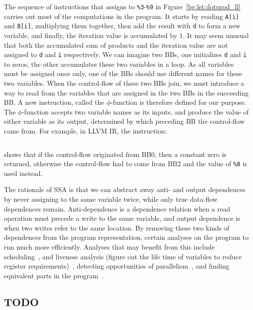 The sequence of instructions that assigns to \verb|%3|-\verb|%9| in
Figure~\ref{bg:lst:dotprod_ll} carries out most of the computations in the
program.  It starts by reading \verb|A[i]| and \verb|B[i]|, multiplying them
together, then add the result with \verb|d| to form a new variable, and
finally, the iteration value is accumulated by $1$.  It may seem unusual that
both the accumulated sum of products and the iteration value are not assigned
to \verb|d| and \verb|i| respectively.  We can imagine two BBs, one initializes
\verb|d| and \verb|i| to zeros, the other accumulates these two variables in
a loop.  As all variables must be assigned once only, one of the BBs should
use different names for these two variables.  When the control-flow of these
two BBs join, we must introduce a way to read from the variables that are
assigned in the two BBs in the succeeding BB\@.  A new instruction, called the
$\phi$-function is therefore defined for our purpose.  The $\phi$-function
accepts two variable names as its inputs, and produce the value of either
variable as its output, determined by which preceding BB the control-flow came
from.  For example, in LLVM IR, the instruction:
\begin{lstlisting}[language=LLVM, basicstyle=\tt]
    %d.01 = phi float [ 0.000000e+00, %0 ], [ %8, %2 ]
\end{lstlisting}\vspace{-16.5pt}
shows that if the control-flow originated from BB0, then a constant zero is
returned, otherwise the control-flow had to come from BB2 and the value of
\verb|%8| is used instead.

The rationale of SSA is that we can abstract away anti- and output dependences
by never assigning to the same variable twice, while only true data-flow
dependences remain.  Anti-dependence is a dependence relation when a read
operation must precede a write to the same variable, and output dependence is
when two writes refer to the same location.  By removing these two kinds of
dependences from the program representation, certain analyses on the program
to run much more efficiently.  Analyses that may benefit from this include
scheduling~\cite{rau94}, and liveness analysis (figure out the life time
of variables to reduce register requirements)~\cite{cytron91}, detecting
opportunities of parallelism~\cite{cytron87}, and finding equivalent parts in
the program~\cite{alpern88}.


\subsection{TODO}

